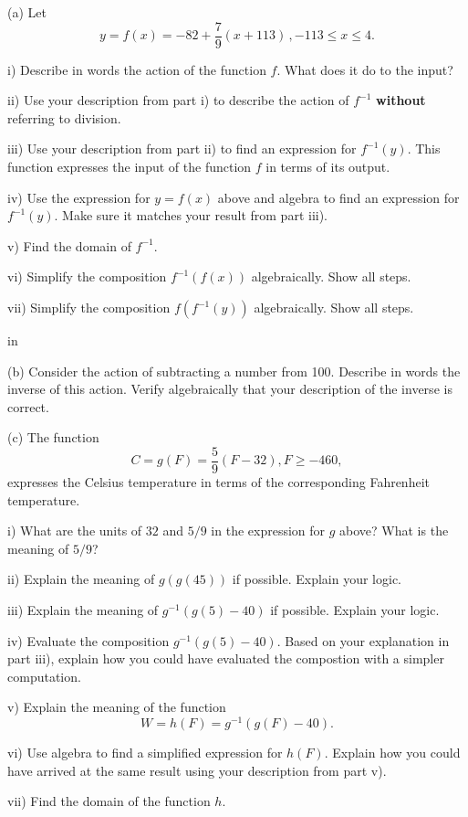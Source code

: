 \documentclass{ximera}
\newcommand{\pskip}{\vskip 0.1 in}
\begin{document}
\begin{example} \label{Ex6:Inverses}
(a) Let
\[
  y = f(x) = -82 + \frac{7}{9}(x+113)  \, , -113\leq x \leq 4 .
\] 

i) Describe in words the action of the function $f$. What does it do to the input?

ii) Use your description from part i) to describe the action of $f^{-1}$ {\bf without} referring to division.

iii) Use your description from part ii) to find an expression for $f^{-1}(y)$. This function expresses the input of the function $f$ in terms of its output.

iv) Use the expression for $y=f(x)$ above and algebra to find an expression for $f^{-1}(y)$. Make sure it matches your result from part iii).

v) Find the domain of $f^{-1}$.

vi) Simplify the composition $f^{-1}(f(x))$ algebraically. Show all steps.

vii) Simplify the composition $f(f^{-1}(y))$ algebraically. Show all steps.

\pskip

(b) Consider the action of subtracting a number from 100. Describe in words the inverse of this action. Verify algebraically that your description of the inverse is correct.

(c) The function
\[
    C = g(F) = \frac{5}{9}\left( F - 32  \right) , F\geq -460 ,
\]
expresses the Celsius temperature in terms of the corresponding Fahrenheit temperature.

i) What are the units of $32$ and $5/9$ in the expression for $g$ above? What is the meaning of $5/9$?

ii) Explain the meaning of $g(g(45))$ if possible. Explain your logic.

iii) Explain the meaning of $g^{-1}(g(5)-40)$ if possible. Explain your logic.

iv) Evaluate the composition $g^{-1}(g(5)-40)$. Based on your explanation in part iii), explain how you could have evaluated the compostion with a simpler computation.

v) Explain the  meaning of the function
\[
    W = h(F) = g^{-1}(g(F)-40) .
\]

vi) Use algebra to find a simplified expression for $h(F)$. Explain how you could have arrived at the same result using your description from part v).

vii) Find the domain of the function $h$.



\end{example}
\end{document}
